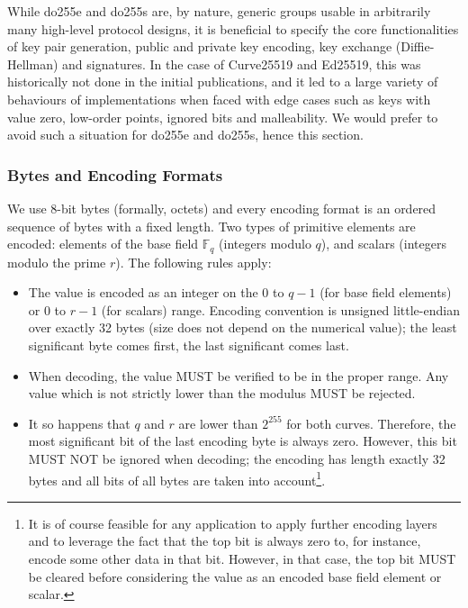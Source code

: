 \documentclass{llncs}
\newcommand{\bF}{\mathbb{F}}
\begin{document}
While do255e and do255s are, by nature, generic groups usable in
arbitrarily many high-level protocol designs, it is beneficial to
specify the core functionalities of key pair generation, public and
private key encoding, key exchange (Diffie-Hellman) and signatures. In
the case of Curve25519 and Ed25519, this was historically not done in
the initial publications, and it led to a large variety of behaviours
of implementations when faced with edge cases such as keys with value
zero, low-order points, ignored bits and malleability\cite{ZcashZip215}.
We would prefer to avoid such a situation for do255e and do255s, hence
this section.

\subsubsection{Bytes and Encoding Formats}

We use 8-bit bytes (formally, octets) and every encoding format is an
ordered sequence of bytes with a fixed length. Two types of primitive
elements are encoded: elements of the base field $\bF_q$ (integers
modulo $q$), and scalars (integers modulo the prime $r$). The following
rules apply:
\begin{itemize}

    \item The value is encoded as an integer on the $0$ to $q-1$ (for
    base field elements) or $0$ to $r-1$ (for scalars) range. Encoding
    convention is unsigned little-endian over exactly 32 bytes (size
    does not depend on the numerical value); the least significant byte
    comes first, the last significant comes last.

    \item When decoding, the value MUST be verified to be in the proper
    range. Any value which is not strictly lower than the modulus MUST
    be rejected.

    \item It so happens that $q$ and $r$ are lower than $2^{255}$ for
    both curves. Therefore, the most significant bit of the last
    encoding byte is always zero. However, this bit MUST NOT be ignored
    when decoding; the encoding has length exactly 32 bytes and all bits
    of all bytes are taken into account\footnote{It is of course
    feasible for any application to apply further encoding layers and to
    leverage the fact that the top bit is always zero to, for instance,
    encode some other data in that bit. However, in that case, the top
    bit MUST be cleared before considering the value as an encoded base
    field element or scalar.}.

\end{itemize}
\end{document}
